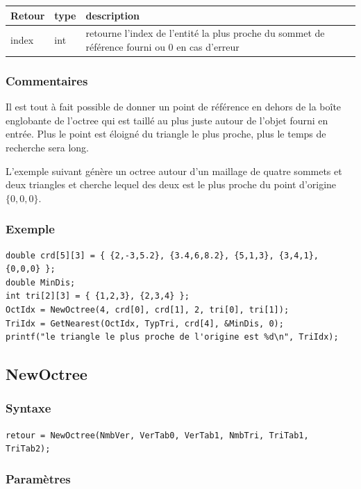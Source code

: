 \documentclass[a4paper,12pt]{article}
\begin{document}
\medskip

\begin{tabular}{|m{3cm}|m{2cm}|m{8.5cm}|}
\hline
Retour     & type   & description \\
\hline
index      & int    & retourne l'index de l'entité la plus proche du sommet de référence fourni ou 0 en cas d'erreur \\
\hline
\end{tabular}
\subsubsection*{Commentaires}
Il est tout à fait possible de donner un point de référence en dehors de la boîte englobante de l'octree qui est taillé au plus juste autour de l'objet fourni en entrée. Plus le point est éloigné du triangle le plus proche, plus le temps de recherche sera long.

L'exemple suivant génère un octree autour d'un maillage de quatre sommets et deux triangles et cherche lequel des deux est le plus proche du point d'origine $\{0,0,0\}$.

\subsubsection*{Exemple}

\begin{tt}
\begin{verbatim}
double crd[5][3] = { {2,-3,5.2}, {3.4,6,8.2}, {5,1,3}, {3,4,1}, {0,0,0} };
double MinDis;
int tri[2][3] = { {1,2,3}, {2,3,4} };
OctIdx = NewOctree(4, crd[0], crd[1], 2, tri[0], tri[1]);
TriIdx = GetNearest(OctIdx, TypTri, crd[4], &MinDis, 0);
printf("le triangle le plus proche de l'origine est %d\n", TriIdx);
\end{verbatim}
\end{tt}
\normalfont



\subsection{NewOctree}
\subsubsection*{Syntaxe}
{\tt retour = NewOctree(NmbVer, VerTab0, VerTab1, NmbTri, TriTab1, TriTab2);}
\subsubsection*{Paramètres}
\end{document}
